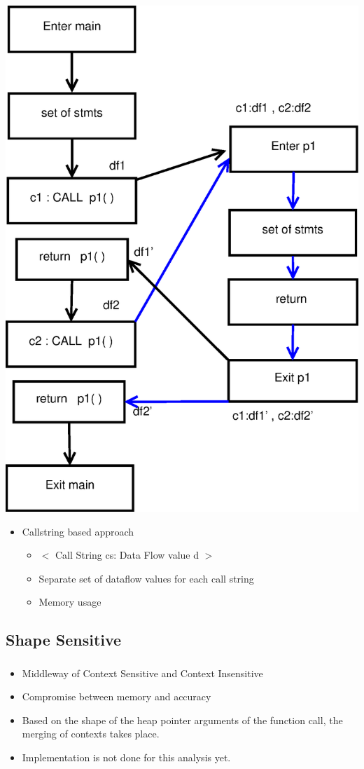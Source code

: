 \documentclass[mathserif,10pt]{beamer}
\begin{document}
\frame
{
  \frametitle{\subsecname}
   \centering  \includegraphics[scale=0.25]{Figures/Diagram12.eps}                  
   \begin{itemize}
    \item Callstring based approach	
	\begin{itemize}
	\item $<$ Call String cs: Data Flow value d $>$
	\item Separate set of dataflow values for each call string
	\item Memory usage
	\end{itemize}    
   \end{itemize}  
}

\subsection{Shape Sensitive}
\begin{frame}[fragile]
  \frametitle{\subsecname}
  \begin{itemize}
   \item Middleway of Context Sensitive and Context Insensitive \pause
   \item Compromise between memory and accuracy \pause
   \item Based on the shape of the heap pointer arguments of the function call, the merging of contexts takes place.\pause
   \item Implementation is not done for this analysis yet.
  \end{itemize}
\end{frame}
\end{document}

